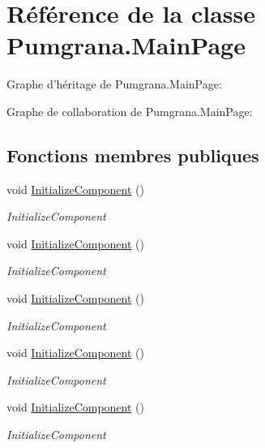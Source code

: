 \hypertarget{class_pumgrana_1_1_main_page}{\section{Référence de la classe Pumgrana.\+Main\+Page}
\label{class_pumgrana_1_1_main_page}
}


Graphe d'héritage de Pumgrana.\+Main\+Page\+:


Graphe de collaboration de Pumgrana.\+Main\+Page\+:
\subsection*{Fonctions membres publiques}
\begin{DoxyCompactItemize}
\item 
void \hyperlink{class_pumgrana_1_1_main_page_a1ad0d739e3bb052fad563e53d50b940e}{Initialize\+Component} ()
\begin{DoxyCompactList}\small\item\em Initialize\+Component \end{DoxyCompactList}\item 
void \hyperlink{class_pumgrana_1_1_main_page_a1ad0d739e3bb052fad563e53d50b940e}{Initialize\+Component} ()
\begin{DoxyCompactList}\small\item\em Initialize\+Component \end{DoxyCompactList}\item 
void \hyperlink{class_pumgrana_1_1_main_page_a1ad0d739e3bb052fad563e53d50b940e}{Initialize\+Component} ()
\begin{DoxyCompactList}\small\item\em Initialize\+Component \end{DoxyCompactList}\item 
void \hyperlink{class_pumgrana_1_1_main_page_a1ad0d739e3bb052fad563e53d50b940e}{Initialize\+Component} ()
\begin{DoxyCompactList}\small\item\em Initialize\+Component \end{DoxyCompactList}\item 
void \hyperlink{class_pumgrana_1_1_main_page_a1ad0d739e3bb052fad563e53d50b940e}{Initialize\+Component} ()
\begin{DoxyCompactList}\small\item\em Initialize\+Component \end{DoxyCompactList}\item 

\end{DoxyCompactItemize}
